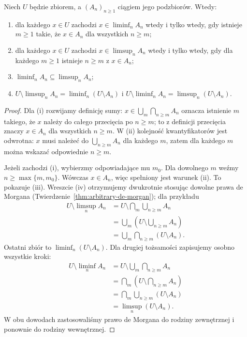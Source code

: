 \begin{twierdzenie}\label{thm:set-lims}
Niech $U$ będzie zbiorem, a $(A_n)_{n\ge1}$ ciągiem jego podzbiorów. Wtedy:
\begin{enumerate}[label=(\roman*)]
\item dla każdego $x\in U$ zachodzi $x\in\liminf_n A_n$
wtedy i tylko wtedy, gdy istnieje $m\ge1$ takie, że
$x\in A_n$ dla wszystkich $n\ge m$;
\item dla każdego $x\in U$ zachodzi $x\in\limsup_n A_n$
wtedy i tylko wtedy, gdy dla każdego $m\ge1$
istnieje $n\ge m$ z $x\in A_n$;
\item $\liminf_n A_n\subseteq\limsup_n A_n$;
\item $U\setminus\limsup_n A_n
=\liminf_n (U\setminus A_n)$ i
$U\setminus\liminf_n A_n
=\limsup_n(U\setminus A_n)$.
\end{enumerate}
\end{twierdzenie}
\begin{proof}
Dla (i) rozwijamy definicję sumy:
$x\in\bigcup_m\bigcap_{n\ge m}A_n$ oznacza istnienie $m$
takiego, że $x$ należy do całego przecięcia po $n\ge m$;
to z definicji przecięcia znaczy $x\in A_n$ dla wszystkich
$n\ge m$. W (ii) kolejność kwantyfikatorów jest odwrotna:
$x$ musi należeć do $\bigcup_{n\ge m}A_n$ dla każdego
$m$, zatem dla każdego $m$ można wskazać odpowiednie $n\ge m$.

Jeżeli zachodzi (i), wybierzmy odpowiadające mu $m_0$.
Dla dowolnego $m$ weźmy $n\ge\max\{m,m_0\}$.
Wówczas $x\in A_n$, więc spełniony jest warunek (ii).
To pokazuje (iii). Wreszcie (iv) otrzymujemy dwukrotnie
stosując dowolne prawa de Morgana
(Twierdzenie~\ref{thm:arbitrary-de-morgan}); dla przykładu
\begin{align*}
U\setminus\limsup_n A_n
&=U\setminus\bigcap_m\bigcup_{n\ge m}A_n\\
&=\bigcup_m\left(U\setminus\bigcup_{n\ge m}A_n\right)\\
&=\bigcup_m\bigcap_{n\ge m}(U\setminus A_n).
\end{align*}
Ostatni zbiór to $\liminf_n(U\setminus A_n)$.
Dla drugiej tożsamości zapisujemy osobno wszystkie kroki:
\begin{align*}
U\setminus\liminf_n A_n
&=U\setminus\bigcup_m\bigcap_{n\ge m}A_n\\
&=\bigcap_m\left(U\setminus\bigcap_{n\ge m}A_n\right)\\
&=\bigcap_m\bigcup_{n\ge m}(U\setminus A_n)\\
&=\limsup_n(U\setminus A_n).
\end{align*}
W obu dowodach zastosowaliśmy prawo de Morgana do rodziny
zewnętrznej i ponownie do rodziny wewnętrznej.
\end{proof}

